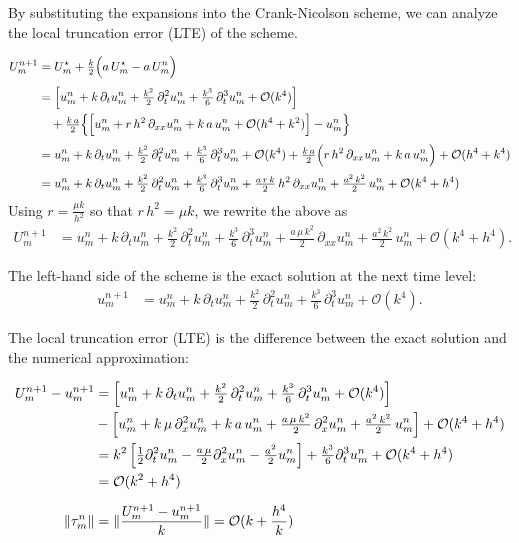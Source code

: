 By substituting the expansions into the Crank-Nicolson scheme, we can analyze the local truncation error (LTE) of the scheme.

\begin{align*}
  U_m^{n+1} &= U_m^\star + \tfrac{k}{2} \Bigl( a\,U_m^\star - a\,U_m^n \Bigr) \\[1mm]
    &= \Bigl[ u_m^n + k\,\partial_t u_m^n + \tfrac{k^2}{2}\,\partial_t^2 u_m^n + \tfrac{k^3}{6}\,\partial_t^3 u_m^n + \mathcal{O}(k^4) \Bigr] \\
    &\quad {}+ \tfrac{k\,a}{2}\Bigl\{ \Bigl[ u_m^n + r\,h^2\,\partial_{xx} u_m^n + k\,a\,u_m^n 
           + \mathcal{O}(h^4+k^2) \Bigr] - u_m^n \Bigr\} \\[1mm]
    &= u_m^n + k\,\partial_t u_m^n + \tfrac{k^2}{2}\,\partial_t^2 u_m^n 
           + \tfrac{k^3}{6}\,\partial_t^3 u_m^n + \mathcal{O}(k^4) + \tfrac{k\,a}{2}\Bigl( r\,h^2\,\partial_{xx} u_m^n + k\,a\,u_m^n \Bigr) + \mathcal{O}(h^4+k^4) \\[1mm]
    &= u_m^n + k\,\partial_t u_m^n + \tfrac{k^2}{2}\,\partial_t^2 u_m^n 
           + \tfrac{k^3}{6}\,\partial_t^3 u_m^n 
           + \tfrac{a\,r\,k}{2}\,h^2\,\partial_{xx} u_m^n + \tfrac{a^2\,k^2}{2}\,u_m^n
           + \mathcal{O}(k^4+h^4)
\end{align*}
Using \(r=\frac{\mu k}{h^2}\) so that \(r\,h^2=\mu k\), we rewrite the above as
\begin{align*}
  U_m^{n+1} &= u_m^n + k\,\partial_t u_m^n + \tfrac{k^2}{2}\,\partial_t^2 u_m^n 
           + \tfrac{k^3}{6}\,\partial_t^3 u_m^n 
           + \tfrac{a\,\mu\,k^2}{2}\,\partial_{xx} u_m^n + \tfrac{a^2\,k^2}{2}\,u_m^n
           + \mathcal{O}(k^4+h^4).
\end{align*}

The left-hand side of the scheme is the exact solution at the next time level:
\begin{align*}
  u_m^{n+1} 
    &= u_m^n + k\,\partial_t u_m^n + \tfrac{k^2}{2}\,\partial_t^2 u_m^n 
           + \tfrac{k^3}{6}\,\partial_t^3 u_m^n + \mathcal{O}(k^4).
\end{align*}

The local truncation error (LTE) is the difference between the exact solution and the numerical approximation:

\begin{align*}
  U_m^{n+1} - u_m^{n+1}  &= 
  \left[ u_m^n + k\,\partial_t u_m^n + \tfrac{k^2}{2}\,\partial_t^2 u_m^n + \tfrac{k^3}{6}\,\partial_t^3 u_m^n + \mathcal{O}(k^4) \right] \\
  &- \left[ u_m^n + k\,\mu\,\partial_{x}^2 u_m^n + k\,a\,u_m^n + \tfrac{a\,\mu\,k^2}{2}\,\partial_{x}^2 u_m^n + \tfrac{a^2\,k^2}{2}\,u_m^n \right] + \mathcal{O}(k^4+h^4) \\
  &= k^2 \left[\tfrac{1}{2}\partial_t^2 u_m^n - \tfrac{a \,\mu}{2}\partial_{x}^2 u_m^n - \tfrac{a^2}{2}u_m^n\right] + \tfrac{k^3}{6}\partial_t^3 u_m^n + \mathcal{O}(k^4+h^4) \\
  &= \mathcal{O}(k^2 + h^4)\\[2mm]
  \lVert\tau_m^n\rVert &= \lVert\frac{U_m^{n+1} - u_m^{n+1}}{k}\rVert = \mathcal{O}(k + \frac{h^4}{k})\\
\end{align*}

